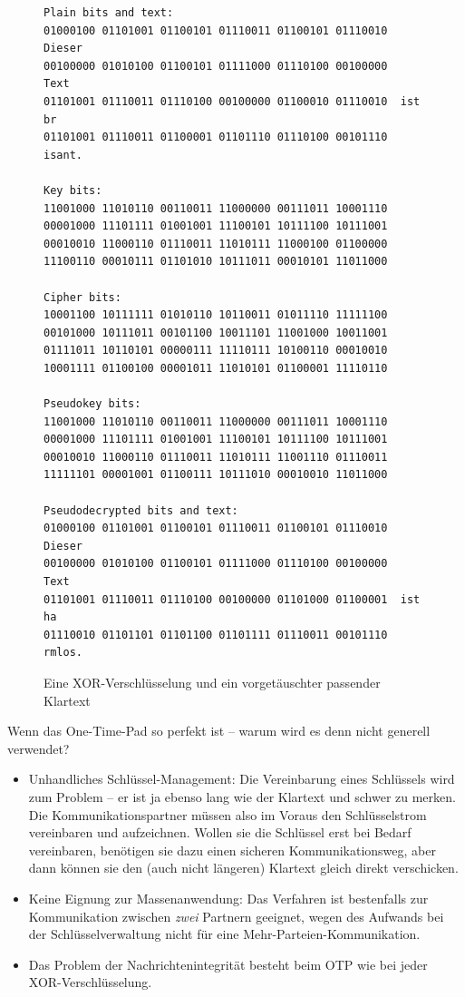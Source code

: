 \begin{refsegment}
\begin{figure}
\begin{center}
\begin{verbatim}
Plain bits and text:
01000100 01101001 01100101 01110011 01100101 01110010  Dieser
00100000 01010100 01100101 01111000 01110100 00100000   Text
01101001 01110011 01110100 00100000 01100010 01110010  ist br
01101001 01110011 01100001 01101110 01110100 00101110  isant.

Key bits:
11001000 11010110 00110011 11000000 00111011 10001110
00001000 11101111 01001001 11100101 10111100 10111001
00010010 11000110 01110011 11010111 11000100 01100000
11100110 00010111 01101010 10111011 00010101 11011000

Cipher bits:
10001100 10111111 01010110 10110011 01011110 11111100
00101000 10111011 00101100 10011101 11001000 10011001
01111011 10110101 00000111 11110111 10100110 00010010
10001111 01100100 00001011 11010101 01100001 11110110

Pseudokey bits:
11001000 11010110 00110011 11000000 00111011 10001110
00001000 11101111 01001001 11100101 10111100 10111001
00010010 11000110 01110011 11010111 11001110 01110011
11111101 00001001 01100111 10111010 00010010 11011000

Pseudodecrypted bits and text:
01000100 01101001 01100101 01110011 01100101 01110010  Dieser
00100000 01010100 01100101 01111000 01110100 00100000   Text
01101001 01110011 01110100 00100000 01101000 01100001  ist ha
01110010 01101101 01101100 01101111 01110011 00101110  rmlos.
\end{verbatim}
\end{center}
\caption{Eine XOR-Verschlüsselung und ein vorgetäuschter passender
   Klartext}\label{fig-bool-otp}
\end{figure}

Wenn das One-Time-Pad so perfekt ist -- warum wird es denn
nicht generell verwendet?
\begin{itemize}
\item Unhandliches Schlüssel-Management:
      Die Vereinbarung eines Schlüs\-sels wird zum Problem -- er ist
      ja ebenso lang wie der Klartext und schwer zu merken. Die
      Kommunikationspartner müssen also im Voraus den Schlüsselstrom
      vereinbaren und aufzeichnen. Wollen sie die Schlüssel erst bei
      Bedarf vereinbaren,
      benötigen sie dazu einen sicheren Kommunikationsweg,
      aber dann können sie den (auch nicht längeren) Klartext
      gleich direkt verschicken.
\item Keine Eignung zur Massenanwendung:
      Das Verfahren ist bestenfalls zur Kommunikation zwischen
      {\em zwei} Partnern geeignet, wegen des Aufwands bei der
      Schlüsselverwaltung nicht für eine Mehr-Parteien-Kommunikation.
\item Das Problem der Nachrichtenintegrität besteht beim OTP wie
      bei jeder XOR-Verschlüsselung.
\end{itemize}


\end{refsegment}

